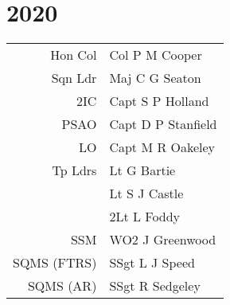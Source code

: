 \chapter*{2020}

\vspace*{10mm}

\begin{center}
  \small
  \begin{tabular}{rl}
    Hon Col & Col P M Cooper \\
    Sqn Ldr & Maj C G Seaton \\
    2IC & Capt S P Holland \\
    PSAO & Capt D P Stanfield \\
    LO & Capt M R Oakeley \\
    Tp Ldrs & Lt G Bartie \\
      & Lt S J Castle \\
      & 2Lt L Foddy \\
    SSM & WO2 J Greenwood \\
    SQMS (FTRS) & SSgt L J Speed \\
    SQMS (AR) & SSgt R Sedgeley \\
  \end{tabular}
\end{center}

\vspace*{5mm}

